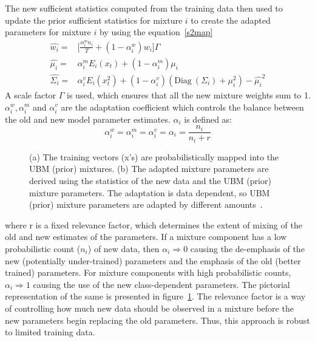 \begin{spacing}{1.5}
The new sufficient statistics computed from the training data then used to update the prior sufficient statistics for mixture $i$ to create the adapted parameters for mixture $i$ by using the equation~\ref{s2map} 
\begin{equation}
\label{s2map}
    \begin{aligned}
     \hat{w_{i}}=&\Bigg[\frac{\alpha_{i}^{w}n_{i}}{T}+(1-\alpha_{i}^{w})w_{i}\Bigg]\Gamma\\
     \hat{\mu_{i}}=&\alpha_{i}^{m}E_{i}(x_{t})+(1-\alpha_{i}^{m})\mu_{i}\\
      \hat{\Sigma_{i}}=&\alpha_{i}^{v}E_{i}(x_{t}^{2})+(1-\alpha_{i}^{v})(\mbox{Diag}~( \Sigma_{i})+\mu_{i}^{2})-\hat{\mu_{i}}^{2}
    \end{aligned}
\end{equation}
 A scale factor $\Gamma$ is used, which ensures that all the new mixture weights sum to 1. $\alpha_{i}^{w},\alpha_{i}^{m}$ and $\alpha_{i}^{v}$ are the adaptation coefficient which controls the balance between the old and new model parameter estimates. $\alpha_{i}$ is defined as:
 \begin{equation}
   \alpha_{i}^{w}=\alpha_{i}^{m}= \alpha_{i}^{v}=\alpha_{i}=\frac{n_{i}}{n_{i}+r}
 \end{equation} 
 \begin{figure}[h]
\caption{(a) The training vectors (x’s) are probabilistically mapped
into the UBM (prior) mixtures. (b) The adapted mixture parameters are derived using the statistics of the new data and the UBM (prior) mixture parameters. The adaptation is data dependent, so UBM (prior) mixture parameters are adapted by different amounts~\cite{reynolds1995speaker}.}
\label{map}
\end{figure}
 where r is a fixed relevance factor, which determines the extent of mixing of the old and new estimates of the parameters. If a mixture component has a low probabilistic count ($n_{i}$) of new data, then $\alpha_{i}\Rightarrow 0$ causing the de-emphasis of the new (potentially under-trained) parameters and the emphasis of the old (better trained) parameters. For mixture components with high probabilistic counts, $\alpha_{i}\Rightarrow 1$ causing the use of the new class-dependent parameters. The pictorial representation of the same is presented in figure~\ref{map}. The relevance factor is a way of controlling how much new data should be observed in a mixture before the new parameters begin replacing the old parameters. Thus, this approach is robust to limited training data.
 


\end{spacing}
